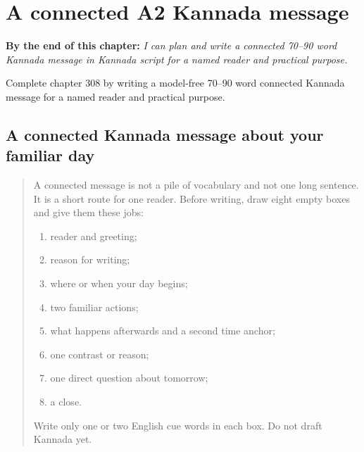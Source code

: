 
\chapter{A connected A2 Kannada message}
\label{ch:ka-a-connected-a2-kannada-message}

\begin{chapteropening}
\textbf{By the end of this chapter:} \emph{I can plan and write a connected 70–90 word Kannada message in Kannada script for a named reader and practical purpose.}

Complete chapter 308 by writing a model-free 70–90 word connected Kannada message for a named reader and practical purpose.
\end{chapteropening}

\section[(connected A2 Kannada writing)]{A connected Kannada message about your familiar day}

\label{lesson:KA-W308-a2-connected-composition}



\begin{quote}
A connected message is not a pile of vocabulary and not one long sentence. It is a short route for one reader. Before writing, draw eight empty boxes and give them these jobs:

\begin{enumerate}
\raggedright
  \item reader and greeting;
  \item reason for writing;
  \item where or when your day begins;
  \item two familiar actions;
  \item what happens afterwards and a second time anchor;
  \item one contrast or reason;
  \item one direct question about tomorrow;
  \item a close.
\end{enumerate}

Write only one or two English cue words in each box. Do not draft Kannada yet.
\end{quote}

